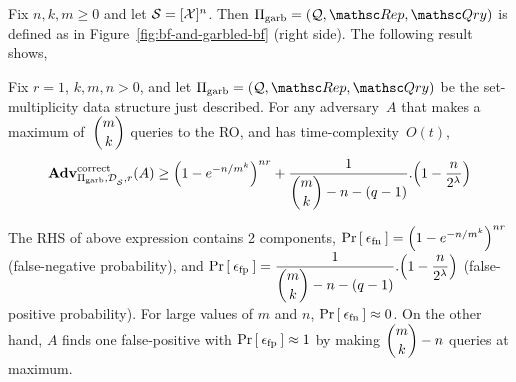 Fix $n,k,m \geq 0$ and let $\mathcal{S}=[{\cal X}]^n$.  Then $\Pi_{\mathrm{garb}}= (\calQ,\Rep, \Qry)$ is defined as in Figure~\ref{fig:bf-and-garbled-bf} (right side).  The following result shows,

\begin{theorem}\label{thm:gbf-correctness}
Fix $r=1$, $k,m,n>0$, and let $\Pi_{\mathrm{garb}}= (\calQ,\Rep, \Qry)$ be the set-multiplicity data structure just described. For any adversary~$A$ that makes a maximum of~$\dbinom{m}{k}$ queries to the RO, and has time-complexity~$O(t)$,
\[
\mathrm{\mathbf{Adv}}^{\mathrm{correct}}_{\Pi_{\mathrm{garb}},\mathcal{D}_{{\cal S}}^{},r}(A)  \geq   \left(1 - e^{-n/m^k}\right)^{nr} + \dfrac{1}{\dbinom{m}{k}-n-(q-1)} . \Big(1-\dfrac{n}{2^\lambda}\Big)
\]

The RHS of above expression contains 2 components, $\Pr\left[\: \epsilon_{\mathrm{fn}} \:\right]= \left(1 - e^{-n/m^k}\right)^{nr}$ (false-negative probability), and $\Pr\left[\: \epsilon_{\mathrm{fp}} \:\right]=\dfrac{1}{\dbinom{m}{k}-n-(q-1)} . \Big(1-\dfrac{n}{2^\lambda}\Big)$ (false-positive probability). For large values of $m$ and $n$, $\Pr\left[\: \epsilon_{\mathrm{fn}} \:\right] \approx 0$. On the other hand, $A$ finds one false-positive with $\Pr\left[\: \epsilon_{\mathrm{fp}} \:\right] \approx 1$ by making $\dbinom{m}{k} - n$ queries at maximum.

\end{theorem}

